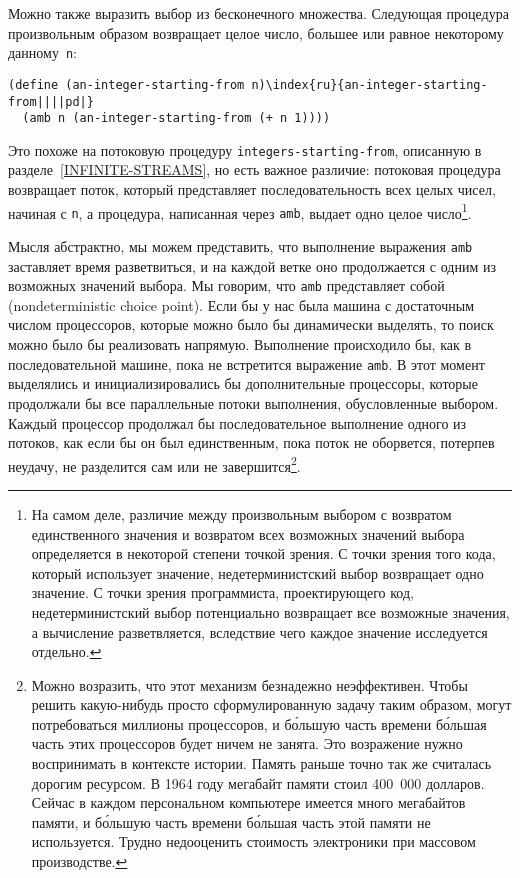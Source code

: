 Можно также выразить выбор из бесконечного множества.
Следующая процедура произвольным образом возвращает целое число,
большее или равное некоторому данному~{\tt n}:

\begin{Verbatim}[fontsize=\small]
(define (an-integer-starting-from n)\index{ru}{an-integer-starting-from||||pd|}
  (amb n (an-integer-starting-from (+ n 1))))
\end{Verbatim}
Это похоже на потоковую процедуру {\tt integers-starting-from},
описанную в разделе~\ref{INFINITE-STREAMS}, но есть важное
различие: потоковая процедура возвращает поток, который представляет
последовательность всех целых чисел, начиная с {\tt n}, а
процедура, написанная через {\tt amb}, выдает одно целое
число\footnote{На самом деле, различие между произвольным выбором с
возвратом единственного значения и возвратом всех возможных значений выбора
определяется в некоторой степени точкой зрения.  С точки зрения того кода, 
который использует значение, недетерминистский выбор возвращает одно
значение.  С точки зрения программиста, проектирующего код,
недетерминистский выбор потенциально возвращает все возможные
значения, а вычисление разветвляется, вследствие чего каждое значение
исследуется отдельно.}.

Мысля абстрактно, мы можем представить, что выполнение выражения
{\tt amb} заставляет  время разветвиться, и на каждой ветке оно
продолжается с одним из возможных значений выбора. Мы говорим, что
{\tt amb} представляет собой 
 (nondeterministic choice point).  Если бы у нас 
была машина с достаточным числом процессоров, которые можно было бы 
динамически выделять, то поиск можно было бы реализовать напрямую.  Выполнение
происходило бы, как в последовательной машине, пока не встретится
выражение {\tt amb}.  В этот момент выделялись и
инициализировались бы дополнительные процессоры, которые продолжали бы
все параллельные потоки выполнения, обусловленные выбором.  Каждый
процессор продолжал бы последовательное выполнение одного из потоков,
как если бы он был
единственным,  пока поток не оборвется, потерпев неудачу, не разделится
сам или не завершится\footnote{Можно возразить, что этот механизм безнадежно
неэффективен.  Чтобы решить какую-нибудь просто сформулированную
задачу таким образом, могут потребоваться миллионы процессоров, и
б\'{о}льшую часть времени б\'{о}льшая часть этих процессоров будет ничем не занята.
Это возражение нужно воспринимать в контексте истории.  Память раньше
точно так же считалась дорогим ресурсом.  
В 1964 году мегабайт памяти
стоил 400~000 долларов.  Сейчас в каждом персональном компьютере
имеется много мегабайтов памяти, и б\'{о}льшую часть времени б\'{о}льшая часть
этой памяти не используется.  Трудно недооценить стоимость электроники
при массовом производстве.}.

